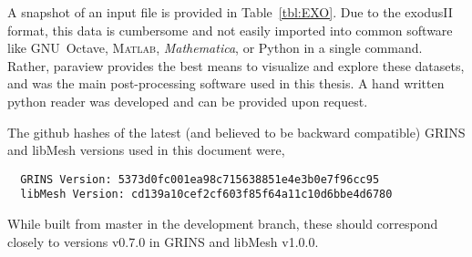 A snapshot of an input file is provided in Table~\ref{tbl:EXO}. 
Due to the exodusII format, this data is cumbersome and not easily
imported into common software like GNU~Octave,
\textsc{Matlab}\textsuperscript{\textregistered},
\textit{Mathematica}\textsuperscript{\textregistered}, or Python in a
single command. Rather, paraview provides the best means to visualize 
and explore these datasets, and was the main post-processing software
used in this thesis. A hand written python reader was developed and can
be provided upon request. 

The github hashes of the latest (and believed to be backward compatible)
GRINS and libMesh versions used in this document were, 
\begin{verbatim}
  GRINS Version: 5373d0fc001ea98c715638851e4e3b0e7f96cc95                                                  
  libMesh Version: cd139a10cef2cf603f85f64a11c10d6bbe4d6780
\end{verbatim}
%
While built from master in the development branch, these should
correspond closely to versions v0.7.0 in GRINS and libMesh v1.0.0.  

